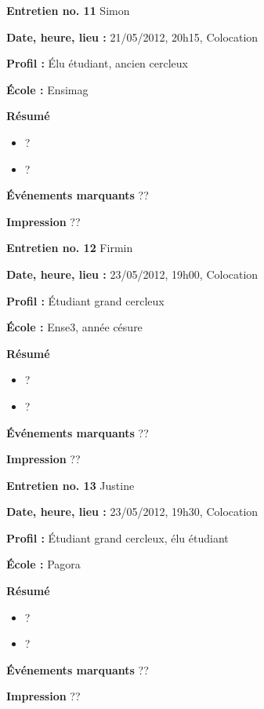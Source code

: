 \documentclass[a4paper, 11px]{article}
\begin{document}
 \textbf {\large Entretien no. 11}
Simon

\textbf{Date, heure, lieu : }
21/05/2012, 20h15, Colocation

\textbf{Profil : }
Élu étudiant, ancien cercleux

\textbf{École : }
Ensimag

\textbf{Résumé}
	\begin{itemize}
		\item ?
		\item ?
	\end{itemize}

\textbf{Événements marquants}
??

\textbf{Impression}
??



\vspace{.3cm}

 \textbf {\large Entretien no. 12}
Firmin

\textbf{Date, heure, lieu : }
23/05/2012, 19h00, Colocation

\textbf{Profil : }
Étudiant grand cercleux

\textbf{École : }
Ense3, année césure

\textbf{Résumé}
	\begin{itemize}
		\item ?
		\item ?
	\end{itemize}

\textbf{Événements marquants}
??

\textbf{Impression}
??


\vspace{.3cm}

 \textbf {\large Entretien no. 13}
Justine

\textbf{Date, heure, lieu : }
23/05/2012, 19h30, Colocation

\textbf{Profil : }
Étudiant grand cercleux, élu étudiant

\textbf{École : }
Pagora

\textbf{Résumé}
	\begin{itemize}
		\item ?
		\item ?
	\end{itemize}

\textbf{Événements marquants}
??

\textbf{Impression}
??

\end{document}
